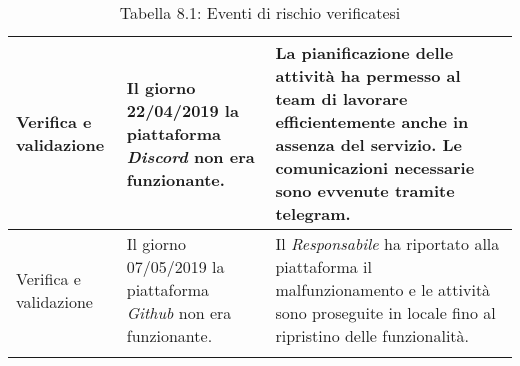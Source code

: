 \begin{longtable}{| L{7em} | L{15em} | L{16em} |}
Verifica e validazione & Il giorno 22/04/2019 la piattaforma \emph{Discord} non era funzionante. & La pianificazione delle attività ha permesso al team di lavorare efficientemente anche in assenza del servizio. Le comunicazioni necessarie sono evvenute tramite telegram. \\
\hline

Verifica e validazione & Il giorno 07/05/2019 la piattaforma \emph{Github} non era funzionante. & Il \emph{Responsabile} ha riportato alla piattaforma il malfunzionamento e le attività sono proseguite in locale fino al ripristino delle funzionalità. \\
\hline

\caption{Tabella 8.1: Eventi di rischio verificatesi\label{}}
\end{longtable}
\renewcommand{\arraystretch}{1}
\newpage
